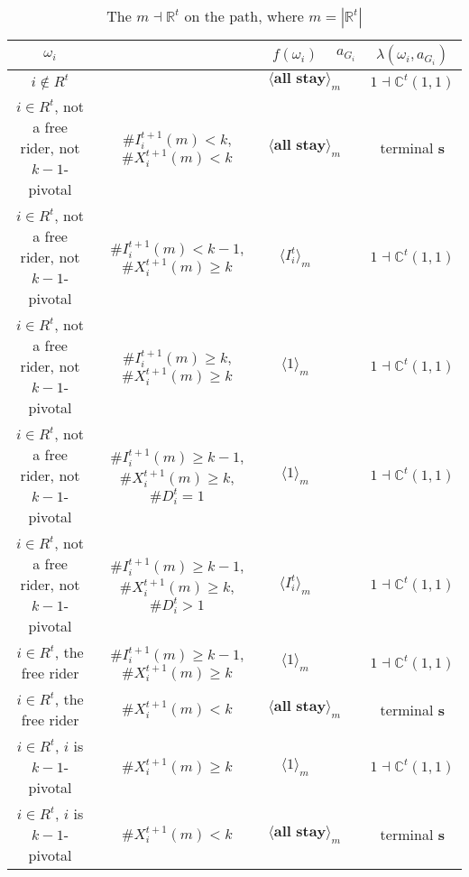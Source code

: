 \documentclass[12pt,letter]{article}
\newcommand{\Kappa}{\mathbb{C}}
\newcommand{\Omicron}{\mathbb{R}}
\theoremstyle{definition}
\theoremstyle{definition}
\theoremstyle{remark}
\theoremstyle{claim}
\begin{document}
\begin{landscape}
\begin{table}[!htbp]
\caption{The $m\dashv\Omicron^t$ on the path, where $m=|\Omicron^t|$}
\label{table:eqm_path_ot2}
\begin{center}
\begin{tabular}{c c | c | c | c}
$\omega_i$ 	 & 	   &	$f(\omega_i)$  &	$a_{G_i}$ & $\lambda(\omega_i,a_{G_i})$ \\
\hline
\hline
$i\notin R^t$  	& 								& $\langle \textbf{all stay} \rangle_m$		&  			& $1\dashv \Kappa^t(1,1)$ \\
$i\in R^t$, not a free rider, not $k-1$-pivotal		 	&  $\#I^{t+1}_i(m)< k$, $\#X^{t+1}_i(m)<k$			&  $\langle \textbf{all stay} \rangle_m$	& 	& terminal \textbf{s} \\
$i\in R^t$, not a free rider, not $k-1$-pivotal	  	& $\#I^{t+1}_i(m)<k-1$, $\#X^{t+1}_i(m)\geq k$		    & $\langle I^t_i \rangle_m$ 		&    			& $1\dashv \Kappa^t(1,1)$ \\
$i\in R^t$, not a free rider, not $k-1$-pivotal	 	&  $\#I^{t+1}_i(m)\geq k$, $\#X^{t+1}_i(m)\geq k$	& $\langle 1 \rangle_m$ 	& 	& $1\dashv \Kappa^t(1,1)$ \\
$i\in R^t$, not a free rider, not $k-1$-pivotal	 	&  $\#I^{t+1}_i(m)\geq k-1$, $\#X^{t+1}_i(m)\geq k$, $\#D^t_i=1$	& $\langle 1 \rangle_m$ 	& 	& $1\dashv \Kappa^t(1,1)$ \\
$i\in R^t$, not a free rider, not $k-1$-pivotal	 	&  $\#I^{t+1}_i(m)\geq k-1$, $\#X^{t+1}_i(m)\geq k$, $\#D^t_i>1$	& $\langle I^t_i \rangle_m$ 	& 	& $1\dashv \Kappa^t(1,1)$ \\
$i\in R^t$, the free rider  	&  $\#I^{t+1}_i(m)\geq k-1$, $\#X^{t+1}_i(m)\geq k$ & $\langle 1 \rangle_m$ 		& 				  & $1\dashv \Kappa^t(1,1)$ \\
$i\in R^t$, the free rider  	&  		$\#X^{t+1}_i(m)<k$					&  $\langle \textbf{all stay} \rangle_m$		& 										  & terminal \textbf{s} \\
$i\in R^t$, $i$ is $k-1$-pivotal  	&  $\#X^{t+1}_i(m)\geq k$ & $\langle 1 \rangle_m$ 	& 											 & $1\dashv \Kappa^t(1,1)$ \\
$i\in R^t$, $i$ is $k-1$-pivotal  	&  	$\#X^{t+1}_i(m)<k$		&  $\langle \textbf{all stay} \rangle_m$	& 											 & terminal \textbf{s} \\
\hline
\end{tabular}
\end{center}
\end{table}


\end{landscape}
\end{document}
